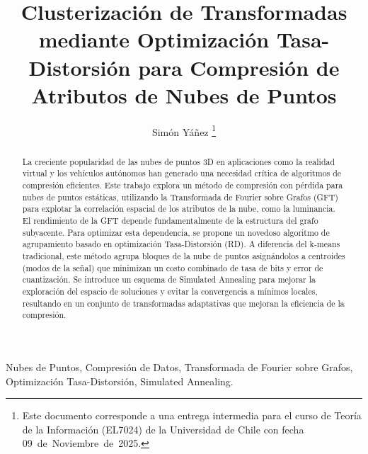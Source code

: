 \newtheorem{definition}{Definición}
\newtheorem{theorem}{Teorema}
\newtheorem{proposition}{Proposición}
\newtheorem{lemma}{Lema}




\title{Clusterización de Transformadas mediante
Optimización Tasa-Distorsión para Compresión de
Atributos de Nubes de Puntos}

\author{Simón Yáñez%
\thanks{Este documento corresponde a una entrega intermedia para el curso de Teoría de la Información (EL7024) de la Universidad de Chile con fecha 09~de~Noviembre~de~2025.}}

%
{}

\maketitle
    


\begin{abstract}
La creciente popularidad de las nubes de puntos 3D en aplicaciones como la realidad virtual y los vehículos autónomos
han generado una necesidad crítica de algoritmos de compresión eficientes. Este trabajo explora un método de compresión
con pérdida para nubes de puntos estáticas, utilizando la Transformada de Fourier sobre Grafos (GFT) para explotar la
correlación espacial de los atributos de la nube, como la luminancia. El rendimiento de la GFT depende
fundamentalmente de la estructura del grafo subyacente. Para optimizar esta dependencia, se propone un novedoso
algoritmo de agrupamiento basado en optimización Tasa-Distorsión (RD). A diferencia del k-means tradicional, este
método agrupa bloques de la nube de puntos asignándolos a centroides (modos de la señal) que minimizan un costo
combinado de tasa de bits y error de cuantización. Se introduce un esquema de Simulated Annealing para mejorar la
exploración del espacio de soluciones y evitar la convergencia a mínimos locales, resultando en un conjunto de
transformadas adaptativas que mejoran la eficiencia de la compresión.
\end{abstract}

\begin{IEEEkeywords}
Nubes de Puntos, Compresión de Datos, Transformada de Fourier sobre Grafos, Optimización Tasa-Distorsión, Simulated
Annealing.
\end{IEEEkeywords}

